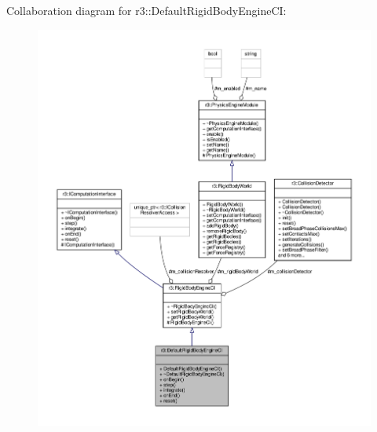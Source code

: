 Collaboration diagram for r3\+:\+:Default\+Rigid\+Body\+Engine\+CI\+:\nopagebreak
\begin{figure}[H]
\begin{center}
\leavevmode
\includegraphics[width=350pt]{classr3_1_1_default_rigid_body_engine_c_i__coll__graph}
\end{center}
\end{figure}
